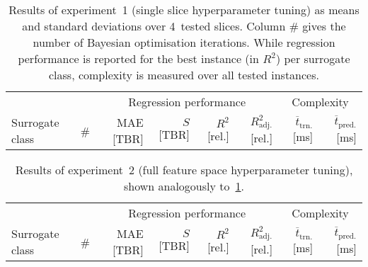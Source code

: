 \begin{table}[h]
	\centering
	{\footnotesize
		\begin{tabular}{lrrrrrrr}
		\toprule
		{} & {} & \multicolumn{4}{c}{Regression performance} &
		\multicolumn{2}{c}{Complexity}\\
		\cmidrule(lr){3-6}
		\cmidrule(lr){7-8}
		Surrogate class & \# & MAE [TBR] & $S$ [TBR] & $R^2$ [rel.] & $R^2_{\text{adj.}}$ [rel.]
						& $\overline{t}_{\text{trn.}}$ [ms] &
						$\overline{t}_{\text{pred.}}$ [ms]\\
		\midrule
		
		\bottomrule
		\end{tabular}
	}
	\caption{Results of experiment~1 (single slice hyperparameter tuning) as
		means and standard deviations over 4~tested slices. Column \# gives the number of Bayesian
		optimisation iterations. While regression performance is reported for the
		best instance (in $R^2$) per surrogate class, complexity is measured over all tested instances.}
	\label{tbl:exp1-detailed-results}
\end{table}

\begin{table}[h]
	\centering
	{\footnotesize
		\begin{tabular}{lrrrrrrr}
		\toprule
		{} & {} & \multicolumn{4}{c}{Regression performance} &
		\multicolumn{2}{c}{Complexity}\\
		\cmidrule(lr){3-6}
		\cmidrule(lr){7-8}
		Surrogate class & \# & MAE [TBR] & $S$ [TBR] & $R^2$ [rel.] & $R^2_{\text{adj.}}$ [rel.]
						& $\overline{t}_{\text{trn.}}$ [ms] &
						$\overline{t}_{\text{pred.}}$ [ms]\\
		\midrule
		
		\bottomrule
		\end{tabular}
	}
	\caption{Results of experiment~2 (full feature space hyperparameter tuning),
		shown analogously to~\cref{tbl:exp1-detailed-results}.}
	\label{tbl:exp2-detailed-results}
\end{table}

